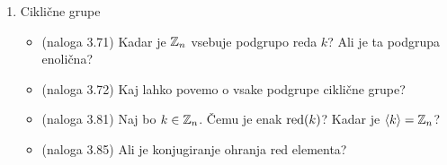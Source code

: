 \begin{enumerate}
    \item Ciklične grupe
    \begin{itemize}
        \item (naloga 3.71) Kadar je $\mathbb{Z}_n$ vsebuje podgrupo reda $k$? Ali je ta podgrupa enolična?
        \item (naloga 3.72) Kaj lahko povemo o vsake podgrupe ciklične grupe?
        \item (naloga 3.81) Naj bo $k \in \mathbb{Z}_n$. Čemu je enak $\operatorname{red} (k)$? Kadar je $\left\langle k \right\rangle  = \mathbb{Z}_n$?
        \item (naloga 3.85) Ali je konjugiranje ohranja red elementa?
    \end{itemize}
\end{enumerate}
